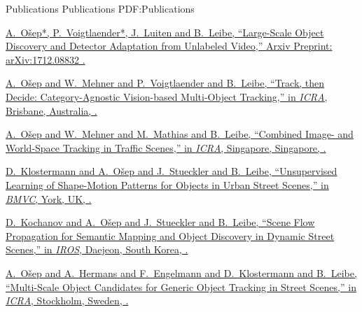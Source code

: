 \documentclass[letterpaper,MMMyyyy,nonstopmode]{simpleresumecv}
\begin{document}
\begin{Body}

\Section
{Publications}
{Publications}
{PDF:Publications}

%
%
%
\begingroup

\Gap
\href{https://arxiv.org/abs/1712.08832}
{\underline{A.~O\v{s}ep}*, P.~Voigtlaender*, J.~Luiten and B.~Leibe,
``Large-Scale Object Discovery and Detector Adaptation from Unlabeled Video,''
Arxiv Preprint:	arXiv:1712.08832 
.}

\Gap
\href{https://arxiv.org/pdf/1712.07920.pdf}
{\underline{A.~O\v{s}ep} and W.~Mehner and P.~Voigtlaender and B.~Leibe,
``Track, then Decide: Category-Agnostic Vision-based Multi-Object Tracking,''
in \textit{ICRA},
Brisbane, Australia,
.}

\Gap
\href{https://www.vision.rwth-aachen.de/media/papers/paper_final_compressed.pdf}
{\underline{A.~O\v{s}ep} and W.~Mehner and M.~Mathias and B.~Leibe,
``Combined Image- and World-Space Tracking in Traffic Scenes,''
in \textit{ICRA},
Singapore, Singapore,
.}

\Gap
\href{https://www.vision.rwth-aachen.de/media/papers/bmvc16_klostermann_final.pdf}
{D.~Klostermann and \underline{A.~O\v{s}ep} and J.~Stueckler and B.~Leibe,
``Unsupervised Learning of Shape-Motion Patterns for Objects in Urban Street Scenes,''
in \textit{BMVC},
York, UK,
.}

\Gap
\href{https://www.vision.rwth-aachen.de/media/papers/paper_compressed.pdf}
{D.~Kochanov and \underline{A.~O\v{s}ep} and J.~Stueckler and B.~Leibe,
``Scene Flow Propagation for Semantic Mapping and Object Discovery in Dynamic Street Scenes,''
in \textit{IROS},
Daejeon, South Korea,
.}

\Gap
\href{https://www.vision.rwth-aachen.de/media/papers/osep_ICRA16_paper.pdf}
{\underline{A.~O\v{s}ep} and A.~Hermans and F.~Engelmann and D.~Klostermann and B.~Leibe,
``Multi-Scale Object Candidates for Generic Object Tracking in Street Scenes,''
in \textit{ICRA}, Stockholm, Sweden,
.}


\end{Body}
\end{document}
